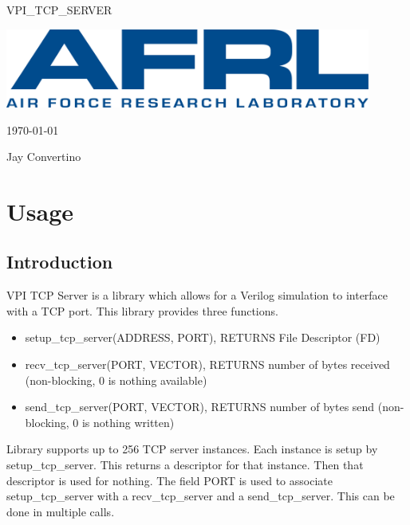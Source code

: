 \begin{titlepage}
  \begin{center}

  {\Huge VPI\_TCP\_SERVER}

  \vspace{25mm}

  \includegraphics[width=0.90\textwidth,height=\textheight,keepaspectratio]{img/AFRL.png}

  \vspace{25mm}

  \today

  \vspace{15mm}

  {\Large Jay Convertino}

  \end{center}
\end{titlepage}

\tableofcontents

\newpage

\section{Usage}

\subsection{Introduction}

\par
VPI TCP Server is a library which allows for a Verilog simulation to interface with a TCP port.
This library provides three functions.
\begin{itemize}
\item setup\_tcp\_server(ADDRESS, PORT), RETURNS File Descriptor (FD)
\item recv\_tcp\_server(PORT, VECTOR), RETURNS number of bytes received (non-blocking, 0 is nothing available)
\item send\_tcp\_server(PORT, VECTOR), RETURNS number of bytes send (non-blocking, 0 is nothing written)
\end{itemize}

\par
Library supports up to 256 TCP server instances. Each instance is setup by
setup\_tcp\_server. This returns a descriptor for that instance. Then that descriptor
is used for nothing. The field PORT is used to associate setup\_tcp\_server with a recv\_tcp\_server
and a send\_tcp\_server. This can be done in multiple calls.


